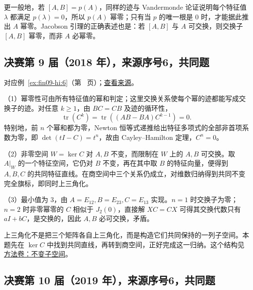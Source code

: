 \documentclass[UTF8,12pt,a4paper,fontset=fandol]{ctexart}
\begin{document}
\begin{remark}[方法与条件]

更一般地，若 $[A,B]=p(A)$，同样的迹与 Vandermonde 论证说明每个特征值 $\lambda$ 都满足 $p(\lambda)=0$，所以 $p(A)$ 幂零；只有当 $p$ 的唯一根是 $0$ 时，才能据此推出 $A$ 幂零。Jacobson 引理的正确表述也是：若 $[A,B]$ 与 $A$ 可交换，则交换子 $[A,B]$ 幂零，而非 $A$ 必幂零。

\end{remark}

\subsection{决赛第 9 届（2018 年），来源序号6，共同题}\label{ans:fin09-hi:6}\label{pr:fin09-hi:6}

对应例~\ref{ex:fin09-hi:6}（第~\pageref{ex:fin09-hi:6} 页）；\href{https://github.com/lzxcr/cmc-mathematics/blob/64916fa1fdbc3e444a652eca204d5669058ee321/src/problems/finals/09/06.md}{查看来源}。

\begin{solve}

（1）幂零性可由所有特征值的幂和判定；这里交换关系使每个幂的迹都能写成交换子的迹。对任意 $k\geq1$，由 $BC=CB$ 及迹的循环性，
\[
\operatorname{tr}(C^k)=\operatorname{tr}((AB-BA)C^{k-1})=0.
\]
特别地，前 $n$ 个幂和都为零，Newton 恒等式递推给出特征多项式的全部非首项系数为零，即 $\det(tI-C)=t^n$，故由 Cayley--Hamilton 定理，$C^n=0$。

（2）非零空间 $W=\ker C$ 对 $A,B$ 不变，而限制在 $W$ 上的 $A,B$ 可交换。取 $A|_W$ 的一个特征空间，它仍对 $B$ 不变，再在其中取 $B$ 的特征向量，便得到 $A,B,C$ 的共同特征直线。在商空间中三个关系仍成立，对维数归纳得到共同不变完全旗标，即同时上三角化。

（3）最小值为 $3$，由 $A=E_{12},B=E_{23},C=E_{13}$ 实现。$n=1$ 时交换子为零；$n=2$ 时非零幂零的 $C$ 相似于 $J_2(0)$，直接解 $XC=CX$ 可得其交换代数只有 $aI+bC$，是交换的，因此 $A,B$ 必可交换，矛盾。

\end{solve}

\begin{remark}[方法与条件]

上三角化不是把三个矩阵各自上三角化，而是构造它们共同保持的一列子空间。本题先在 $\ker C$ 中找到共同直线，再转到商空间，正好完成这一归纳。这个结构见\hyperref[app:linear-invariant]{方法卷：不变子空间}。

\end{remark}

\subsection{决赛第 10 届（2019 年），来源序号6，共同题}\label{ans:fin10-hi:6}\label{pr:fin10-hi:6}
\end{document}

